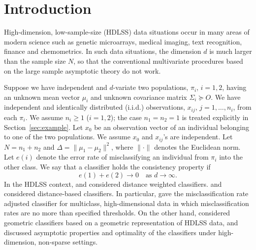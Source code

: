 \section{Introduction}
\label{sec:intro}

High-dimension, low-sample-size (HDLSS) data situations occur in many areas of modern
science such as genetic microarrays, medical imaging, text recognition, finance and
chemometrics. In such data situations, the dimension $d$ is much larger than the sample
size $N$, so that the conventional multivariate procedures based on the large sample
asymptotic theory do not work.

Suppose we have independent and $d$-variate two populations, $\pi_i$, $i=1,2$, having
an unknown mean vector $\mu_i$ and unknown covariance matrix $\Sigma_i\succeq O$.
We have independent and identically distributed (i.i.d.) observations,
$x_{ij}$, $j=1,\dots,n_i$, from each $\pi_i$. We assume $n_i\ge 1$
($i=1,2$); the case $n_1=n_2=1$ is treated explicitly in Section~\ref{sec:example}.
Let $x_0$ be an observation vector of an individual belonging to one of the two
populations. We assume $x_0$ and $x_{ij}$'s are independent. Let
$N=n_1+n_2$ and $\Delta=\|\mu_1-\mu_2\|^2$, where $\|\cdot\|$ denotes the Euclidean
norm. Let $e(i)$ denote the error rate of misclassifying an individual from $\pi_i$
into the other class. We say that a classifier holds the consistency property if
\begin{equation}
e(1)+e(2)\longrightarrow 0
\quad\text{as }d\to\infty.
\label{eq:1.1}
\end{equation}
In the HDLSS context, \citet{hall2005} and \citet{marron2007} considered distance
weighted classifiers. \citet{chan2009} and \citet{aoshima2011} considered
distance-based classifiers. In particular, \citet{aoshima2011} gave the
misclassification rate adjusted classifier for multiclass, high-dimensional data in
which misclassification rates are no more than specified thresholds. On the other
hand, \citet{aoshima2014,aoshima2019} considered geometric classifiers based on a
geometric representation of HDLSS data, and discussed asymptotic properties and
optimality of the classifiers under high-dimension, non-sparse settings.

